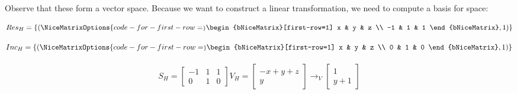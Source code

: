 Observe that these form a vector space. Because we want to construct a linear transformation, we need to compute a basis for space: 
\begin{center}
	\begin{minipage}{0.5\linewidth}
	\begin{equation*}
		Res_H = \{(
		\NiceMatrixOptions{code-for-first-row=\scriptstyle}
			\begin{bNiceMatrix}[first-row=1]
				 x & y & z \\
				 -1 & 1 & 1 
			\end{bNiceMatrix}, 1)\}
	\end{equation*}
	\end{minipage}
	\begin{minipage}{0.4\linewidth}
	\begin{equation*}
	    Inc_H = \{(
	    \NiceMatrixOptions{code-for-first-row=\scriptstyle}
	    	\begin{bNiceMatrix}[first-row=1] 
	    		x & y & z \\
	    		 0 & 1 & 0 
	    	 \end{bNiceMatrix}, 1)\}
	\end{equation*}
	\end{minipage}
\end{center}


\begin{align*}
	S_H = \begin{bmatrix} -1 & 1 & 1 \\ 0 & 1 & 0 \end{bmatrix}
	V_H = \begin{bmatrix} - x + y + z \\ y \end{bmatrix} \rightarrow_V \begin{bmatrix}	1 \\ y + 1 \end{bmatrix}
\end{align*}







